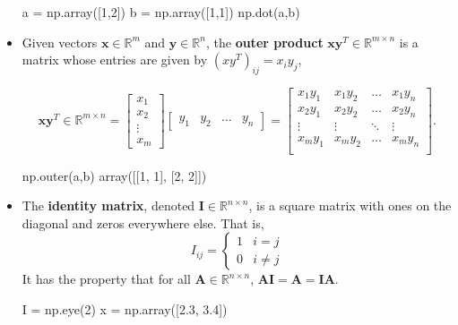 \begin{itemize}
\begin{python}
a = np.array([1,2])
b = np.array([1,1])
np.dot(a,b)
\end{python}

\item Given vectors $\textbf{x} \in \mathbb{R}^{m}$ and $\textbf{y} \in \mathbb{R}^{n}$, the {\bf outer product} $\textbf{xy}^{T} \in \mathbb{R}^{m\times n}$
is a matrix whose entries are given by $({xy}^{T})_{ij}=x_{i}y_{j}$,


\begin{equation*}
\textbf{xy}^{T} \in \mathbb{R}^{m\times n} = \left[\begin{array}{c}
x_{1} \\ x_{2} \\ \vdots \\ x_{m}\end{array}\right] \left[\begin{array}{cccc}
y_{1} &
y_{2} &
\ldots &
y_{n}
\end{array}\right] =   \left[\begin{array}{cccc}
x_{1}y_{1} & x_{1}y_{2} & \ldots & x_{1}y_{n} \\
x_{2}y_{1} & x_{2}y_{2} & \ldots & x_{2}y_{n} \\
\vdots & \vdots & \ddots & \vdots \\
x_{m}y_{1} & x_{m}y_{2} & \ldots & x_{m}y_{n} \\
\end{array}\right].
\end{equation*}

\begin{python}
np.outer(a,b)
array([[1, 1],
       [2, 2]])
\end{python}


\item The {\bf identity matrix}, denoted $\textbf{I}\in \mathbb{R}^{n\times n}$, is a square matrix with ones on the diagonal and zeros 
everywhere else. That is,
\begin{equation*}
I_{ij}=\left\{\begin{array}{cc}
1 & i=j \\
0 & i\neq j
\end{array}\right.
\end{equation*}
It has the property that for all $\textbf{A} \in \mathbb{R}^{n \times n}$, $\textbf{AI} = \textbf{A} = \textbf{IA}.$

\begin{python}
I = np.eye(2)
x = np.array([2.3, 3.4])


\end{python}
\end{itemize}
